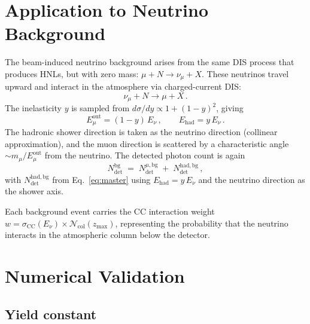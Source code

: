 \documentclass[11pt]{article}
\newcommand{\Ehad}{E_{\mathrm{had}}}
\newcommand{\Emu}{E_{\mu}}
\begin{document}
\section{Application to Neutrino Background}
\label{sec:background}

The beam-induced neutrino background arises from the same DIS process
that produces HNLs, but with zero mass:
$\mu + N \to \nu_\mu + X$.  These neutrinos travel upward and interact
in the atmosphere via charged-current DIS:
\begin{equation}
  \nu_\mu + N \to \mu + X\,.
\end{equation}
The inelasticity $y$ is sampled from
$d\sigma/dy \propto 1 + (1-y)^2$, giving
\begin{equation}
  \Emu^{\mathrm{out}} = (1-y)\,E_\nu\,,
  \qquad
  \Ehad = y\,E_\nu\,.
\end{equation}
The hadronic shower direction is taken as the neutrino direction
(collinear approximation), and the muon direction is scattered by a
characteristic angle $\sim m_\mu / \Emu^{\mathrm{out}}$ from the
neutrino.  The detected photon count is again
\begin{equation}
  N_{\mathrm{det}}^{\mathrm{bg}}
  \;=\;
  N_{\mathrm{det}}^{\mu,\mathrm{bg}}
  \;+\;
  N_{\mathrm{det}}^{\mathrm{had,bg}}\,,
\end{equation}
with $N_{\mathrm{det}}^{\mathrm{had,bg}}$ from Eq.~\eqref{eq:master}
using $\Ehad = y\,E_\nu$ and the neutrino direction as the shower axis.

Each background event carries the CC interaction weight
$w = \sigma_{\mathrm{CC}}(E_\nu) \times
\mathcal{N}_{\mathrm{col}}(z_{\max})$,
representing the probability that the neutrino interacts in the
atmospheric column below the detector.

\section{Numerical Validation}
\label{sec:validation}

\subsection{Yield constant}
\end{document}
